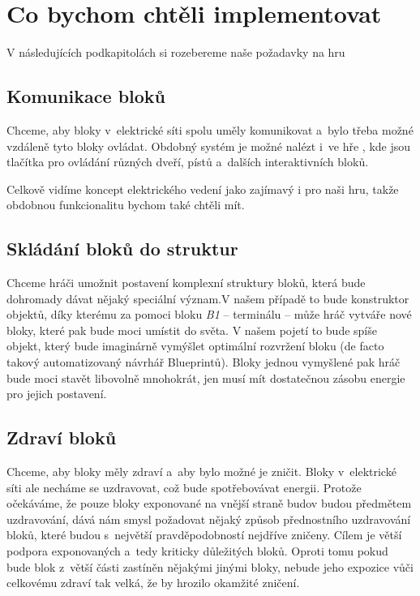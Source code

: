 


\section{Co bychom chtěli implementovat}

V následujících podkapitolách si rozebereme naše požadavky na hru







\subsection{Komunikace bloků}

Chceme, aby bloky v~elektrické síti spolu uměly komunikovat a~bylo třeba možné vzdáleně tyto bloky ovládat. Obdobný systém je možné nalézt i~ve hře \SE{}, kde jsou tlačítka pro ovládání různých dveří, pístů a~dalších interaktivních bloků.


Celkově vidíme koncept elektrického vedení jako zajímavý i pro naši hru, takže obdobnou funkcionalitu bychom také chtěli mít.

\subsection{Skládání bloků do struktur}

Chceme hráči umožnit postavení komplexní struktury bloků, která bude dohromady dávat nějaký speciální význam.V našem případě to bude konstruktor objektů, díky kterému za pomoci bloku \textit{B1} -- terminálu -- může hráč vytváře nové bloky, které pak bude moci umístit do světa. V našem pojetí to bude spíše objekt, který bude imaginárně vymýšlet optimální rozvržení bloku (de facto takový automatizovaný návrhář Blueprintů). Bloky jednou vymyšlené pak hráč bude moci stavět libovolně mnohokrát, jen musí mít dostatečnou zásobu energie pro jejich postavení.

\subsection{Zdraví bloků}
Chceme, aby bloky měly zdraví a~aby bylo možné je zničit. Bloky v~elektrické síti ale necháme se uzdravovat, což bude spotřebovávat energii. Protože očekáváme, že pouze bloky exponované na vnější straně budov budou předmětem uzdravování, dává nám smysl požadovat nějaký způsob přednostního uzdravování bloků, které budou s~největší pravděpodobností nejdříve zničeny. Cílem je větší podpora exponovaných a~tedy kriticky důležitých bloků. Oproti tomu pokud bude blok z~větší části zastíněn nějakými jinými bloky, nebude jeho expozice vůči celkovému zdraví tak velká, že by hrozilo okamžité zničení.

